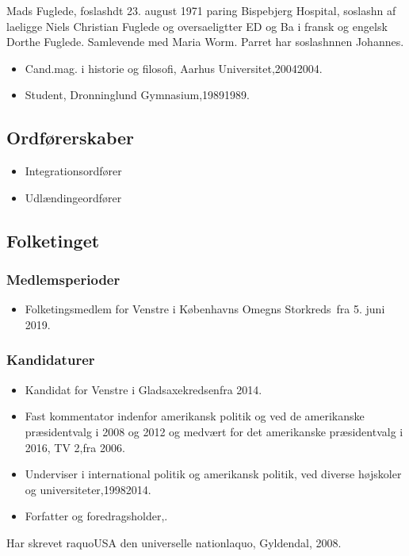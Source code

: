 \documentclass[11pt, a4paper]{awesome-cv}
\begin{document}
\makecvheader[R]
\makelettertitle
\begin{cvletter}
Mads Fuglede, foslashdt 23. august 1971 paring Bispebjerg Hospital, soslashn af laeligge Niels Christian Fuglede og oversaeligtter ED og Ba i fransk og engelsk Dorthe Fuglede. Samlevende med Maria Worm. Parret har soslashnnen Johannes.

\begin{itemize}
\item Cand.mag. i historie og filosofi, Aarhus Universitet,20042004.
\item Student, Dronninglund Gymnasium,19891989.
\end{itemize}
\subsection*{Ordførerskaber}
\begin{itemize}
\item Integrationsordfører
\item Udlændingeordfører
\end{itemize}
\subsection*{Folketinget}
\subsubsection*{Medlemsperioder}
\begin{itemize}
\item Folketingsmedlem for Venstre i Københavns Omegns Storkreds fra 5. juni 2019.
\end{itemize}
\subsubsection*{Kandidaturer}
\begin{itemize}
\item Kandidat for Venstre i Gladsaxekredsenfra 2014.
\end{itemize}
\begin{itemize}
\item Fast kommentator indenfor amerikansk politik og ved de amerikanske præsidentvalg i 2008 og 2012 og medvært for det amerikanske præsidentvalg i 2016, TV 2,fra 2006.
\item Underviser i international politik og amerikansk politik, ved diverse højskoler og universiteter,19982014.
\item Forfatter og foredragsholder,.
\end{itemize}
Har skrevet raquoUSA  den universelle nationlaquo, Gyldendal, 2008.

\end{cvletter}
\end{document}
